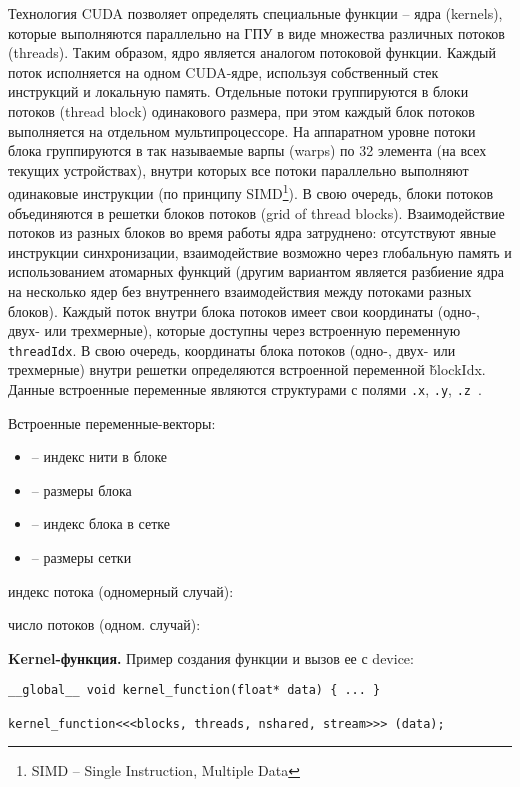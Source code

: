 Технология CUDA позволяет определять специальные функции – ядра (kernels), которые выполняются параллельно на ГПУ в виде множества различных потоков (threads). Таким образом, ядро является аналогом потоковой функции. Каждый поток исполняется на одном CUDA-ядре, используя собственный стек инструкций и локальную память. Отдельные потоки группируются в блоки потоков (thread block) одинакового размера, при этом каждый блок потоков выполняется на отдельном мультипроцессоре.
На аппаратном уровне потоки блока группируются в так называемые варпы (warps) по 32 элемента (на всех текущих устройствах), внутри которых все потоки параллельно выполняют одинаковые инструкции (по принципу SIMD\footnote{SIMD -- Single Instruction, Multiple Data}).
В свою очередь, блоки потоков объединяются в решетки блоков потоков (grid of thread blocks). Взаимодействие потоков из разных блоков во время работы ядра затруднено: отсутствуют явные инструкции синхронизации, взаимодействие возможно через глобальную память и использованием атомарных функций (другим вариантом является разбиение ядра на несколько ядер без внутреннего взаимодействия между потоками разных блоков).
Каждый поток внутри блока потоков имеет свои координаты (одно-, двух- или трехмерные), которые доступны через встроенную переменную \texttt{threadIdx}. В свою очередь, координаты блока потоков (одно-, двух- или трехмерные) внутри решетки определяются встроенной переменной \v{blockIdx}. Данные встроенные переменные являются структурами с полями \texttt{.x}, \texttt{.y}, \texttt{.z}~\cite{DenisenkoSatanin2012}.

Встроенные переменные-векторы:
\begin{itemize}
    \item{} -- индекс нити в блоке
    \item{} -- размеры блока
    \item{} -- индекс блока в сетке
    \item{} -- размеры сетки
\end{itemize}

 индекс потока (одномерный случай): 

 число потоков (одном. случай): 

\textbf{Kernel-функция.} Пример создания функции и вызов ее с device:
\begin{verbatim}
__global__ void kernel_function(float* data) { ... }

kernel_function<<<blocks, threads, nshared, stream>>> (data);
\end{verbatim}

